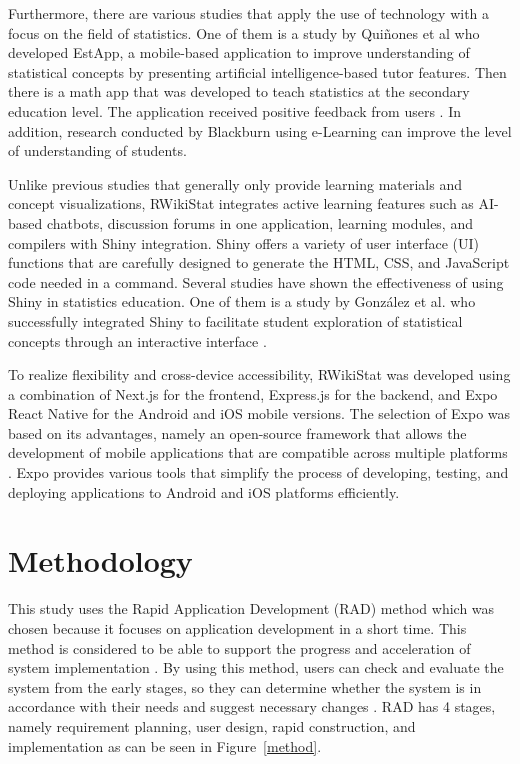 \documentclass[conference,a4paper]{IEEEtran}
\begin{document}
Furthermore, there are various studies that apply the use of technology with a focus on the field of statistics. One of them is a study by Quiñones et al \cite{b14} who developed EstApp, a mobile-based application to improve understanding of statistical concepts by presenting artificial intelligence-based tutor features. Then there is a math app that was developed to teach statistics at the secondary education level. The application received positive feedback from users \cite{b15}. In addition, research conducted by Blackburn \cite{b16} using e-Learning can improve the level of understanding of students.

Unlike previous studies that generally only provide learning materials and concept visualizations, RWikiStat integrates active learning features such as AI-based chatbots, discussion forums in one application, learning modules, and compilers with Shiny integration. Shiny offers a variety of user interface (UI) functions that are carefully designed to generate the HTML, CSS, and JavaScript code needed in a command. Several studies have shown the effectiveness of using Shiny in statistics education. One of them is a study by González et al. who successfully integrated Shiny to facilitate student exploration of statistical concepts through an interactive interface \cite{b17}.

To realize flexibility and cross-device accessibility, RWikiStat was developed using a combination of Next.js for the frontend, Express.js for the backend, and Expo React Native for the Android and iOS mobile versions. The selection of Expo was based on its advantages, namely an open-source framework that allows the development of mobile applications that are compatible across multiple platforms \cite{b18}. Expo provides various tools that simplify the process of developing, testing, and deploying applications to Android and iOS platforms efficiently.

\section{Methodology}
\label{sect:methodology}

This study uses the Rapid Application Development (RAD) method which was chosen because it focuses on application development in a short time. This method is considered to be able to support the progress and acceleration of system implementation \cite{b19}. By using this method, users can check and evaluate the system from the early stages, so they can determine whether the system is in accordance with their needs and suggest necessary changes \cite{b20}. RAD has 4 stages, namely requirement planning, user design, rapid construction, and implementation as can be seen in Figure~\ref{method}.
\end{document}
